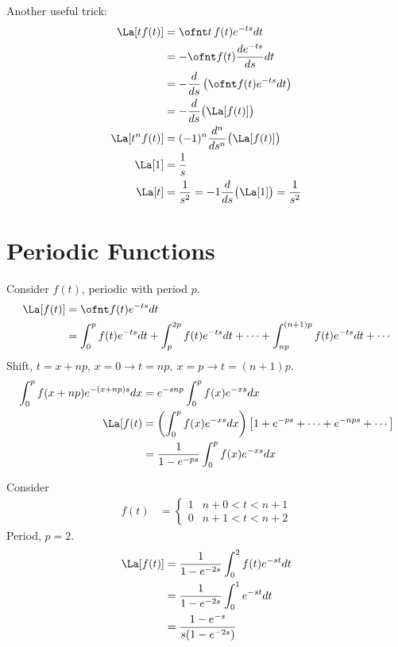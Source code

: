 \documentclass[cplx.tex]{subfiles}
\begin{document}
Another useful trick:
\begin{align}
    \La[tf(t)] &= \ofnt t\,f(t)e^{-ts}dt \\ 
               &= -\ofnt f(t)\frac{de^{-ts}}{ds}dt \\
               &= -\frac{d}{ds} \left(\ofnt f(t)e^{-ts}dt\right) \\
               &= -\frac{d}{ds} \big(\La[f(t)]\big) \\
    \La[t^nf(t)] &= (-1)^n \frac{d^n}{ds^n}\big(\La[f(t)]\big) \\
    \La[1] &= \frac1s \\
    \La[t] &= \frac{1}{s^2} = -1\frac{d}{ds}\big(\La[1]\big) = \frac{1}{s^2} 
\end{align}

\section{Periodic Functions}
Consider $f(t)$, periodic with period $p$.
\begin{align}
    \La[f(t)] &= \ofnt f(t)e^{-ts}dt \\
              &= \int_0^p f(t)e^{-ts}dt + \int_p^{2p} f(t)e^{-ts}dt + \cdots + \int_{np}^{(n+1)p}f(t)e^{-ts}dt + \cdots
\end{align}
Shift, $t=x+np$, $x=0\to t=np,~ x=p\to t=(n+1)p$.
\begin{align}
    \int_0^p f(x+np)e^{-(x+np)s}dx &= e^{-snp}\int_0^p f(x)e^{-xs}dx \\
    \La[f(t) &= \left(\int_0^p f(x)e^{-xs}dx\right)\left[1+e^{-ps}+\cdots+e^{-nps}+\cdots\right] \\
             &= \frac{1}{1-e^{-ps}} \int_0^p f(x)e^{-xs}dx
\end{align}

\begin{example}
Consider
\begin{align}
    f(t) &= \begin{cases}1 & n+0 < t < n+1 \\ 0 & n+1 < t < n+2 \end{cases}
\end{align}
Period, $p=2$.
\begin{align}
    \La[f(t)] &= \frac{1}{1-e^{-2s}} \int_0^2 f(t)e^{-st}dt \\
              &= \frac{1}{1-e^{-2s}} \int_0^1 e^{-st}dt \\
              &= \frac{1-e^{-s}}{s(1-e^{-2s})} 
\end{align}
\end{example}
\end{document}
